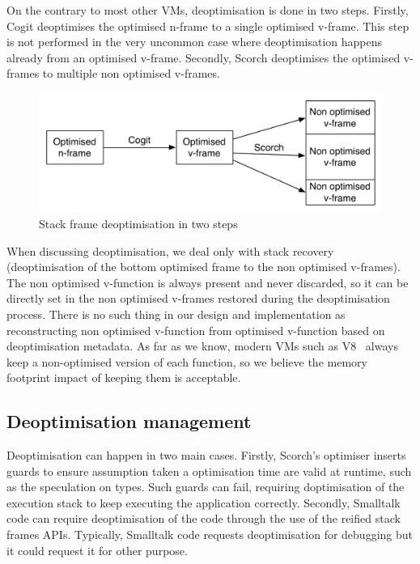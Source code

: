 \documentclass[a4paper,12pt,twoside]{../includes/ThesisStyle}
\begin{document}
On the contrary to most other VMs, deoptimisation is done in two steps. Firstly, Cogit deoptimises the optimised n-frame to a single optimised v-frame. This step is not performed in the very uncommon case where deoptimisation happens already from an optimised v-frame. Secondly, Scorch deoptimises the optimised v-frames to multiple non optimised v-frames.

\begin{figure}[h!]
    \begin{center}
        \includegraphics[width=0.85\linewidth]{SFDeoptimisation}
        \caption{Stack frame deoptimisation in two steps}
        \label{fig:SFDeoptimisation}
    \end{center}
\end{figure}

When discussing deoptimisation, we deal only with stack recovery (deoptimisation of the bottom optimised frame to the non optimised v-frames). The non optimised v-function is always present and never discarded, so it can be directly set in the non optimised v-frames restored during the deoptimisation process. There is no such thing in our design and implementation as reconstructing non optimised v-function from optimised v-function based on deoptimisation metadata. As far as we know, modern VMs such as V8~\cite{V8} always keep a non-optimised version of each function, so we believe the memory footprint impact of keeping them is acceptable.

\subsection{Deoptimisation management}

Deoptimisation can happen in two main cases. Firstly, Scorch's optimiser inserts guards to ensure assumption taken a optimisation time are valid at runtime, such as the speculation on types. Such guards can fail, requiring doptimisation of the execution stack to keep executing the application correctly. Secondly, Smalltalk code can require deoptimisation of the code through the use of the reified stack frames APIs. Typically, Smalltalk code requests deoptimisation for debugging but it could request it for other purpose.
\end{document}
